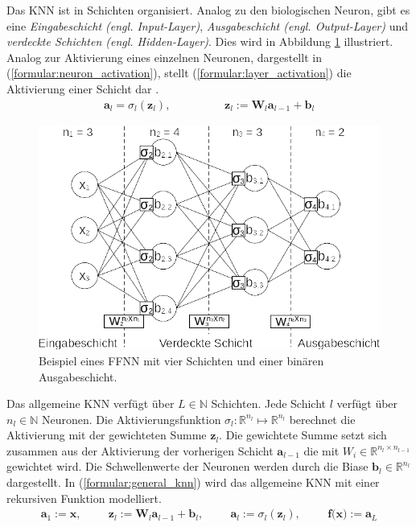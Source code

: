 \newline
\newline
Das KNN ist in Schichten organisiert. Analog zu den biologischen Neuron, gibt es eine \textit{Eingabeschicht (engl. Input-Layer)},
\textit{Ausgabeschicht (engl. Output-Layer)} und \textit{verdeckte Schichten (engl. Hidden-Layer)}.
Dies wird in Abbildung \ref{fig:neural_network_example} illustriert.
Analog zur Aktivierung eines einzelnen Neuronen, dargestellt in (\ref{formular:neuron_activation}), stellt
(\ref{formular:layer_activation}) die Aktivierung einer Schicht dar \cite{higham2019deep}.
\begin{align}
    \label{formular:layer_activation}
    \textbf{a}_{l} = \sigma_l(\textbf{z}_l), \hspace{2cm} \textbf{z}_l := \textbf{W}_l\textbf{a}_{l-1} + \textbf{b}_l
\end{align}
\begin{figure}[h!]
    \centering
    \includegraphics[width=0.8\linewidth]{images/neural_network_example.png}
    \caption{Beispiel eines FFNN mit vier Schichten und einer binären Ausgabeschicht.}
    \label{fig:neural_network_example}
\end{figure}
\newline
Das allgemeine KNN verfügt über $L\in\mathbb{N}$ Schichten. Jede Schicht $l$ verfügt über $n_l\in\mathbb{N}$ Neuronen.
Die Aktivierungsfunktion $\sigma_l:\mathbb{R}^{n_{l}}\mapsto\mathbb{R}^{n_{l}}$ berechnet die Aktivierung mit der gewichteten Summe $\textbf{z}_l$.
Die gewichtete Summe setzt sich zusammen aus der Aktivierung der vorherigen Schicht $\textbf{a}_{l-1}$ die mit $W_i\in\mathbb{R}^{n_{l}\times{n_{l-1}}}$ gewichtet wird.
Die Schwellenwerte der Neuronen werden durch die Biase $\textbf{b}_l\in\mathbb{R}^{n_{l}}$ dargestellt.
In (\ref{formular:general_knn}) wird das allgemeine KNN mit einer rekursiven Funktion modelliert.
\begin{align}
    \label{formular:general_knn}
    \textbf{a}_1 := \textbf{x}, \hspace{1cm}
    \textbf{z}_l := \textbf{W}_l\textbf{a}_{l-1} + \textbf{b}_l, \hspace{1cm}
    \textbf{a}_l := \sigma_l(\textbf{z}_l), \hspace{1cm} \textbf{f(x)} := \textbf{a}_L
\end{align}
